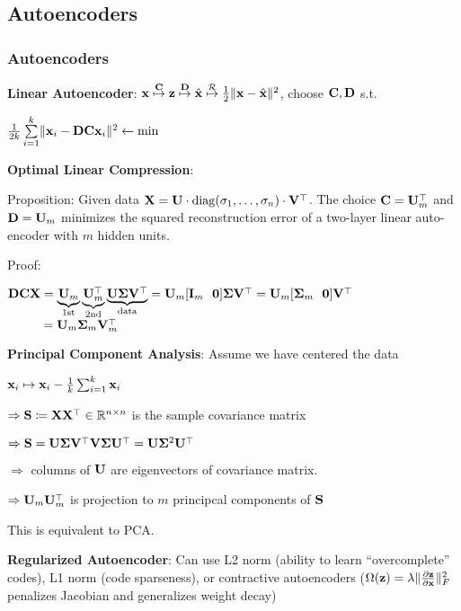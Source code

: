 
\subsection{Autoencoders}
\label{sub:autoencoders}

    \subsubsection{Autoencoders}
    \label{ssub:autoencoders}
    \textbf{Linear Autoencoder}: $\mathbf x\overset{\mathbf C}{\mapsto}\mathbf z\overset{\mathbf D}{\mapsto}\hat{\mathbf x}\overset{\mathcal{R}}{\mapsto}\frac{1}{2}\lVert\mathbf x-\hat{\mathbf x}\rVert^2$, choose $\mathbf C,\mathbf D$ s.t. 
    
    \tab$\frac{1}{2k}\sum\limits^k_{i=1}\lVert\mathbf x_i-\mathbf D\mathbf C\mathbf x_i\rVert^2\xleftarrow{}\min$
    
    \textbf{Optimal Linear Compression}: 
    
    \tab Proposition: Given data $\mathbf X=\mathbf U\cdot{\mathop{\mathrm{diag}}}(\sigma_1,\ldots,\sigma_n)\cdot \mathbf V^{\mathop{\mathrm{\top}}}$. The choice $\mathbf C=\mathbf U_m^{\mathop{\mathrm{\top}}}$ and $\mathbf D=\mathbf U_m$ minimizes the squared reconstruction error of a two-layer linear auto-encoder with $m$ hidden units.
    
    \tab Proof: 
    
    \tab $\mathbf D\mathbf C\mathbf X=\underbrace{\mathbf U_m}_\text{1st} \underbrace{\mathbf U_m^{\mathop{\mathrm{\top}}}}_\text{2nd}\underbrace{\mathbf U\mathbf \Sigma\mathbf V^{\mathop{\mathrm{\top}}}}_\text{data}=\mathbf U_m\lbrack\mathbf I_m\>\>\> \mathbf{0} \rbrack \mathbf \Sigma \mathbf V^{\mathop{\mathrm{\top}}}=\mathbf U_m\lbrack \mathbf \Sigma_m\>\>\> \mathbf{0}\rbrack\mathbf V^{\mathop{\mathrm{\top}}}$\\
    \tab $\phantom{\vD\vC\vX}=\vU_m\vSi_m\vV_m\T$
    
    \textbf{Principal Component Analysis}: Assume we have centered the data
    
    \tab $\mathbf x_i\mapsto\mathbf x_i-\frac{1}{k}\sum^k_{i=1}\mathbf x_i$
    
    $\Rightarrow \mathbf S\coloneqq\mathbf X\mathbf X^{\mathop{\mathrm{\top}}}\in\mathbb R^{n\times n}$ is the sample covariance matrix
    
    $\Rightarrow\mathbf S=\mathbf U\mathbf \Sigma\mathbf V^{\mathop{\mathrm{\top}}}\mathbf V\mathbf \Sigma\mathbf U^{\mathop{\mathrm{\top}}}=\mathbf U\mathbf \Sigma^2\mathbf U^{\mathop{\mathrm{\top}}}$
    
    $\Rightarrow$ columns of $\mathbf U$ are eigenvectors of covariance matrix.
    
    $\Rightarrow\mathbf U_m\mathbf U_m^{\mathop{\mathrm{\top}}}$ is projection to $m$ principcal components of $\mathbf S$
    
    \tab This is equivalent to PCA.
    
    \textbf{Regularized Autoencoder}: Can use L2 norm (ability to learn ``overcomplete'' codes), L1 norm (code sparseness), or contractive autoencoders ($\Omega(\mathbf z)=\lambda\lVert \pdv{\mathbf z}{\mathbf x} \rVert^2_F$ penalizes Jacobian and generalizes weight decay)
    
